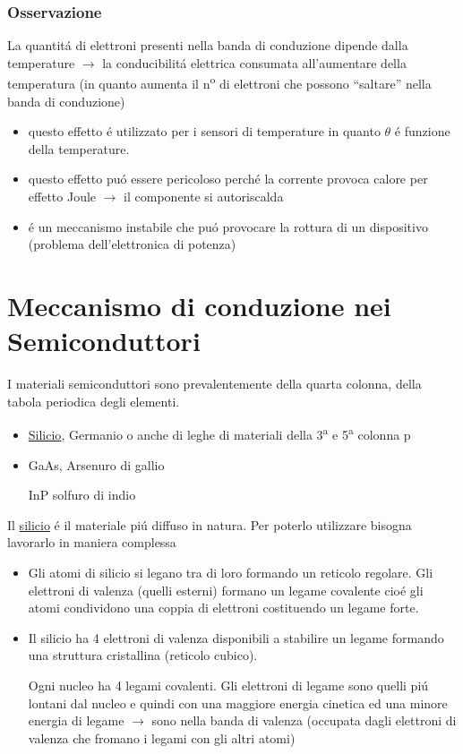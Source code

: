 \subsubsection{Osservazione}
La quantit\'a di elettroni presenti nella banda di conduzione dipende dalla temperature $\rightarrow$ la conducibilit\'a elettrica consumata all'aumentare della temperatura (in quanto aumenta il n\textsuperscript{o} di elettroni che possono ``saltare'' nella banda di conduzione)
\begin{itemize}
    \item questo effetto \'e utilizzato per i sensori di temperature in quanto $\theta$ \'e funzione della temperature.
    \item questo effetto pu\'o essere pericoloso perch\'e la corrente provoca calore per effetto Joule $\rightarrow$ il componente si autoriscalda
    \item \'e un meccanismo instabile che pu\'o provocare la rottura di un dispositivo (problema dell'elettronica di potenza)
\end{itemize}

\section{Meccanismo di conduzione nei Semiconduttori}
I materiali semiconduttori sono prevalentemente della quarta colonna, della tabola periodica degli elementi.

\begin{itemize}
    \item \underline{Silicio}, Germanio o anche di leghe di materiali della 3\textsuperscript{a} e 5\textsuperscript{a} colonna p
    \item GaAs, Arsenuro di gallio

        InP solfuro di indio
\end{itemize}

Il \underline{silicio} \'e il materiale pi\'u diffuso in natura. Per poterlo utilizzare bisogna lavorarlo in maniera complessa
\begin{itemize}

    \item Gli atomi di silicio si legano tra di loro formando un reticolo regolare. Gli elettroni di valenza (quelli esterni) formano un legame covalente cio\'e gli atomi condividono una coppia di elettroni costituendo un legame forte.
    \item Il silicio ha 4 elettroni di valenza disponibili a stabilire un legame formando una struttura cristallina (reticolo cubico).

        Ogni nucleo ha 4 legami covalenti. Gli elettroni di legame sono quelli pi\'u lontani dal nucleo e quindi con una maggiore energia cinetica ed una minore energia di legame $\rightarrow$ sono nella banda di valenza (occupata dagli elettroni di valenza che fromano i legami con gli altri atomi)
\end{itemize}

